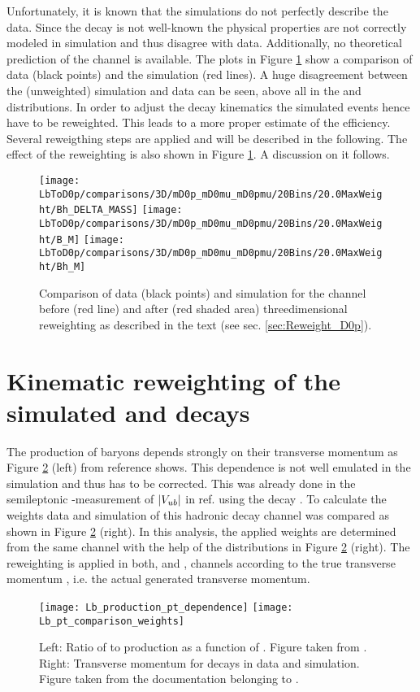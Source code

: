 Unfortunately, it is known that the simulations do not perfectly describe the data. 
Since the decay \LbToDpmunuX is not well-known the physical properties are not correctly modeled in simulation and thus disagree with data.
Additionally, no theoretical prediction of the \LbToDpmunuX channel is available.
The plots in Figure \ref{fig:reweighting} show a comparison of data (black points) and the simulation (red lines).
A huge disagreement between the (unweighted) simulation and data can be seen, above all in the \MDp and \MDmu distributions.
In order to adjust the decay kinematics the simulated events hence have to be reweighted.
This leads to a more proper estimate of the efficiency.
Several reweigthing steps are applied and will be described in the following.
The effect of the reweighting is also shown in Figure \ref{fig:reweighting}.
A discussion on it follows.
\begin{figure}[hptb]
	\centering
	\texttt{[image: LbToD0p/comparisons/3D/mD0p\_mD0mu\_mD0pmu/20Bins/20.0MaxWeight/Bh\_DELTA\_MASS]}
	\texttt{[image: LbToD0p/comparisons/3D/mD0p\_mD0mu\_mD0pmu/20Bins/20.0MaxWeight/B\_M]}
	\texttt{[image: LbToD0p/comparisons/3D/mD0p\_mD0mu\_mD0pmu/20Bins/20.0MaxWeight/Bh\_M]}
	\caption{Comparison of data (black points) and simulation for the \LbToDpmunuX channel before (red line) and after (red shaded area) threedimensional reweighting as described in the text (see sec. \ref{sec:Reweight_D0p}).}
	\label{fig:reweighting}
\end{figure}

\section{Kinematic reweighting of the simulated \LbToDpmunuX and \LbToLcmunu decays}
The production of \Lb baryons depends strongly on their transverse momentum as Figure \ref{fig:LbPTrew} (left) from reference \cite{Lb_production_kinematic} shows. 
This dependence is not well emulated in the simulation and thus has to be corrected. 
This was already done in the semileptonic \lhcb-measurement of $|{V_{{u}{b}}}|$ in ref. \cite{SL_Vub} using the decay \decay{\Lb}{\jpsi\Dz\proton}. 
To calculate the weights data and simulation of this hadronic \Lb decay channel was compared as shown in Figure \ref{fig:LbPTrew} (right). 
In this analysis, the applied weights are determined from the same channel with the help of the distributions in Figure \ref{fig:LbPTrew} (right).
The reweighting is applied in both, \LbToDpmunuX and \LbToLcmunu, channels according to the true \Lb transverse momentum \pt, i.e. the actual generated transverse momentum.
\begin{figure}[hptb]
	\centering
	\texttt{[image: Lb\_production\_pt\_dependence]}
	\texttt{[image: Lb\_pt\_comparison\_weights]}
	\caption{Left: Ratio of \Lb to \Bd production as a function of \pt. Figure taken from \cite{Lb_production_kinematic}.  Right: Transverse \Lb momentum for \decay{\Lb}{\jpsi\Dz\proton} decays in data and simulation. Figure taken from the documentation belonging to \cite{SL_Vub}.}
	\label{fig:LbPTrew}
\end{figure}


